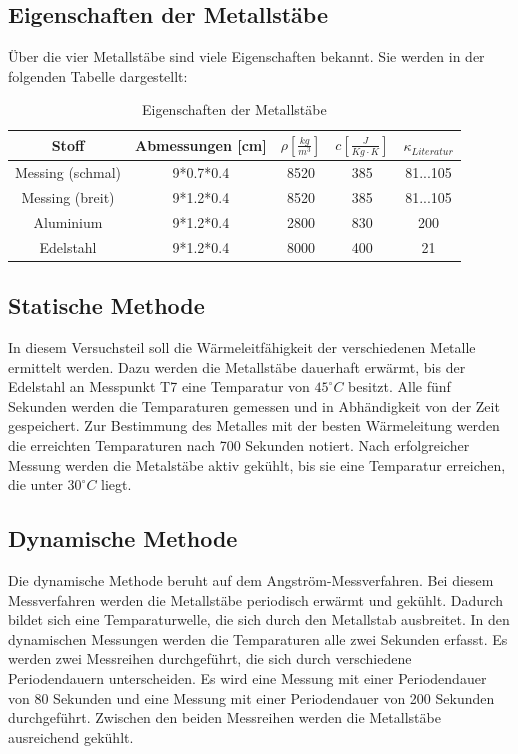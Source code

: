 \documentclass[11pt]{article}
\begin{document}
\subsection{Eigenschaften der Metallstäbe}
Über die vier Metallstäbe sind viele Eigenschaften bekannt. Sie werden in der folgenden Tabelle dargestellt:
\begin{table}[h]
\centering
\begin{tabular}{|c|c|c|c|c|}
\hline
Stoff & Abmessungen [cm] & $\rho \left[ \frac{kg}{m^3} \right] $ & $c \left[ \frac{J}{Kg \cdot K} \right]$ & $ \kappa_{Literatur}$ \\
\hline
Messing (schmal) & 9*0.7*0.4 & 8520 & 385 & 81...105\\
Messing (breit) & 9*1.2*0.4 & 8520 & 385 & 81...105\\
Aluminium  & 9*1.2*0.4 & 2800 & 830 & 200\\
Edelstahl &9*1.2*0.4 & 8000 & 400 & 21\\
\hline
\end{tabular}
\caption{Eigenschaften der Metallstäbe}
\end{table}
\subsection{Statische Methode}
In diesem Versuchsteil soll die Wärmeleitfähigkeit der verschiedenen Metalle ermittelt werden. Dazu werden die Metallstäbe dauerhaft erwärmt, bis der Edelstahl an Messpunkt T7 eine Temparatur von $45^\circ C$ besitzt. Alle fünf Sekunden werden die Temparaturen gemessen und in Abhändigkeit von der Zeit gespeichert. Zur Bestimmung des Metalles mit der besten Wärmeleitung werden die erreichten Temparaturen nach 700 Sekunden notiert. Nach erfolgreicher Messung werden die Metalstäbe aktiv gekühlt, bis sie eine Temparatur erreichen, die unter $30^\circ C$ liegt.
\subsection{Dynamische Methode}
Die dynamische Methode beruht auf dem Angström-Messverfahren. Bei diesem Messverfahren werden die Metallstäbe periodisch erwärmt und gekühlt. Dadurch bildet sich eine Temparaturwelle, die sich durch den Metallstab ausbreitet.
In den dynamischen Messungen werden die Temparaturen alle zwei Sekunden erfasst.
Es werden zwei Messreihen durchgeführt, die sich durch verschiedene Periodendauern unterscheiden. Es wird eine Messung mit einer Periodendauer von 80 Sekunden und eine Messung mit einer Periodendauer von 200 Sekunden durchgeführt. Zwischen den beiden Messreihen werden die Metallstäbe ausreichend gekühlt.
\end{document}
